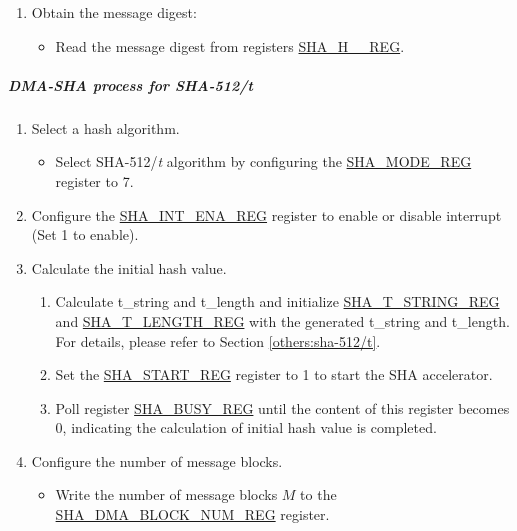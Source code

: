 \documentclass[main\_\_EN.tex]{subfiles}
\begin{document}
\begin{enumerate}
    \item Obtain the message digest:
    \begin{itemize}
        \item Read the message digest from registers \hyperref[regdesc:SHAHNREG]{SHA\_H\_\_REG}.
    \end{itemize}
\end{enumerate}

\subparagraph{DMA-SHA process for SHA-512/{\it{t}}}

\begin{enumerate}
    \item Select a hash algorithm.
    \begin{itemize}
        \item Select SHA-512/{\it{t}} algorithm by configuring the \hyperref[regdesc:SHAMODEREG]{SHA\_MODE\_REG} register to 7.
    \end{itemize}

    \item Configure the \hyperref[regdesc:SHAINTENAREG]{SHA\_INT\_ENA\_REG} register to enable or disable interrupt (Set 1 to enable).

    \item Calculate the initial hash value.
        \begin{enumerate}
            \item Calculate t\_string and t\_length and initialize \hyperref[regdesc:SHATSTRINGREG]{SHA\_T\_STRING\_REG} and  \hyperref[regdesc:SHATLENGTHREG]{SHA\_T\_LENGTH\_REG} with the generated t\_string and t\_length. For details, please refer to Section \ref{others:sha-512/t}.
            \item Set the \hyperref[regdesc:SHASTARTREG]{SHA\_START\_REG} register to 1 to start the SHA accelerator.
            \item Poll register \hyperref[regdesc:SHABUSYREG]{SHA\_BUSY\_REG} until the content of this register becomes 0, indicating the calculation of initial hash value is completed.
        \end{enumerate}

    \item Configure the number of message blocks.
    \begin{itemize}
        \item  Write the number of message blocks \begin{math}M\end{math} to the  \hyperref[regdesc:SHADMABLOCKNUMREG]{SHA\_DMA\_BLOCK\_NUM\_REG} register.
    \end{itemize}


\end{enumerate}
\end{document}
